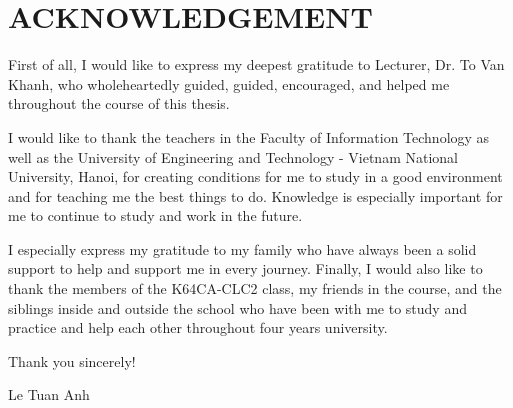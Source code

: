 \chapter*{ACKNOWLEDGEMENT}
\fontsize{13}{15}\selectfont

First of all, I would like to express my deepest gratitude to Lecturer, Dr. To Van Khanh, who wholeheartedly guided, guided, encouraged, and helped me throughout the course of this thesis.

I would like to thank the teachers in the Faculty of Information Technology as well as the University of Engineering and Technology - Vietnam National University, Hanoi, for creating conditions for me to study in a good environment and for teaching me the best things to do. Knowledge is especially important for me to continue to study and work in the future.

I especially express my gratitude to my family who have always been a solid support to help and support me in every journey.
Finally, I would also like to thank the members of the K64CA-CLC2 class, my friends in the course, and the siblings inside and outside the school who have been with me to study and practice and help each other throughout four years university.

Thank you sincerely!


\vspace{2cm}
\begin{flushright}
    Le Tuan Anh\hspace*{1.3cm}
\end{flushright}